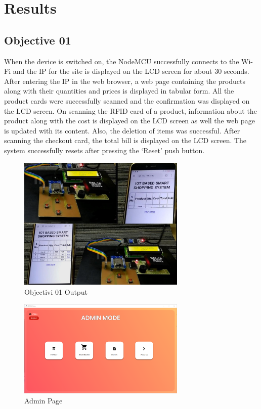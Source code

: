 \documentclass[conference]{IEEEtran}
\begin{document}
\section{Results}
\subsection{Objective 01}
When the device is switched on, the NodeMCU successfully connects to the Wi-Fi and the IP for the site is displayed on the LCD screen for about 30 seconds. After entering the IP in the web browser, a web page containing the products along with their quantities and prices is displayed in tabular form. All the product cards were successfully scanned and the confirmation was displayed on the LCD screen. On scanning the RFID card of a product, information about the product along with the cost is displayed on the LCD screen as well the web page is updated with its content. Also, the deletion of items was successful. After scanning the checkout card, the total bill is displayed on the LCD screen. The system successfully resets after pressing the ‘Reset’ push button.

\begin{figure}[htbp]
	\centerline{\includegraphics[width=80mm]{Iot}}
	\caption{Objectivi 01 Output}
	\label{fig}
\end{figure}



\begin{figure}[!htb]
	\centerline{\includegraphics[width=80mm]{iot-04}}
	\caption{Admin Page}
	\label{fig}
\end{figure}
\end{document}
